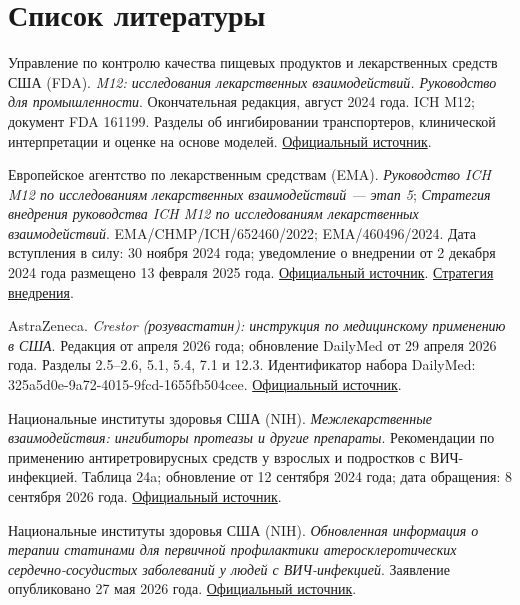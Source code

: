 \documentclass[11pt]{article}
\begin{document}
\section*{Список литературы}

\begin{description}[before={\microtypesetup{expansion=false}\setlength{\RaggedRightRightskip}{0pt plus 4em}\RaggedRight}]
\item[{[1]}] Управление по контролю качества пищевых продуктов и лекарственных средств США (FDA). \textit{M12: исследования лекарственных взаимодействий. Руководство для промышленности}. Окончательная редакция, август 2024 года. ICH M12; документ FDA 161199. Разделы об ингибировании транспортеров, клинической интерпретации и оценке на основе моделей. \href{https://www.fda.gov/media/161199/download}{Официальный источник}.
\item[{[2]}] Европейское агентство по лекарственным средствам (EMA). \textit{Руководство ICH M12 по исследованиям лекарственных взаимодействий --- этап 5}; \textit{Стратегия внедрения руководства ICH M12 по исследованиям лекарственных взаимодействий}. EMA/CHMP/ICH/652460/2022; EMA/460496/2024. Дата вступления в силу: 30 ноября 2024 года; уведомление о внедрении от 2 декабря 2024 года размещено 13 февраля 2025 года. \href{https://www.ema.europa.eu/en/ich-m12-drug-interaction-studies-scientific-guideline}{Официальный источник}. \href{https://www.ema.europa.eu/en/documents/scientific-guideline/implementation-strategy-ich-guideline-m12-drug-interaction-studies_en.pdf}{Стратегия внедрения}.
\item[{[3]}] AstraZeneca. \textit{Crestor (розувастатин): инструкция по медицинскому применению в США}. Редакция от апреля 2026 года; обновление DailyMed от 29 апреля 2026 года. Разделы 2.5--2.6, 5.1, 5.4, 7.1 и 12.3. Идентификатор набора DailyMed: 325a5d0e-9a72-4015-9fcd-1655fb504cee. \href{https://dailymed.nlm.nih.gov/dailymed/drugInfo.cfm?setid=325a5d0e-9a72-4015-9fcd-1655fb504cee}{Официальный источник}.
\item[{[4]}] Национальные институты здоровья США (NIH). \textit{Межлекарственные взаимодействия: ингибиторы протеазы и другие препараты}. Рекомендации по применению антиретровирусных средств у взрослых и подростков с ВИЧ-инфекцией. Таблица 24a; обновление от 12 сентября 2024 года; дата обращения: 8 сентября 2026 года. \href{https://clinicalinfo.hiv.gov/en/guidelines/hiv-clinical-guidelines-adult-and-adolescent-arv/drug-interactions-protease-inhibitors}{Официальный источник}.
\item[{[5]}] Национальные институты здоровья США (NIH). \textit{Обновленная информация о терапии статинами для первичной профилактики атеросклеротических сердечно-сосудистых заболеваний у людей с ВИЧ-инфекцией}. Заявление опубликовано 27 мая 2026 года. \href{https://clinicalinfo.hiv.gov/en/guidelines/hiv-clinical-guidelines-adult-and-adolescent-arv/statin-therapy-people-hiv}{Официальный источник}.

\end{description}
\end{document}

